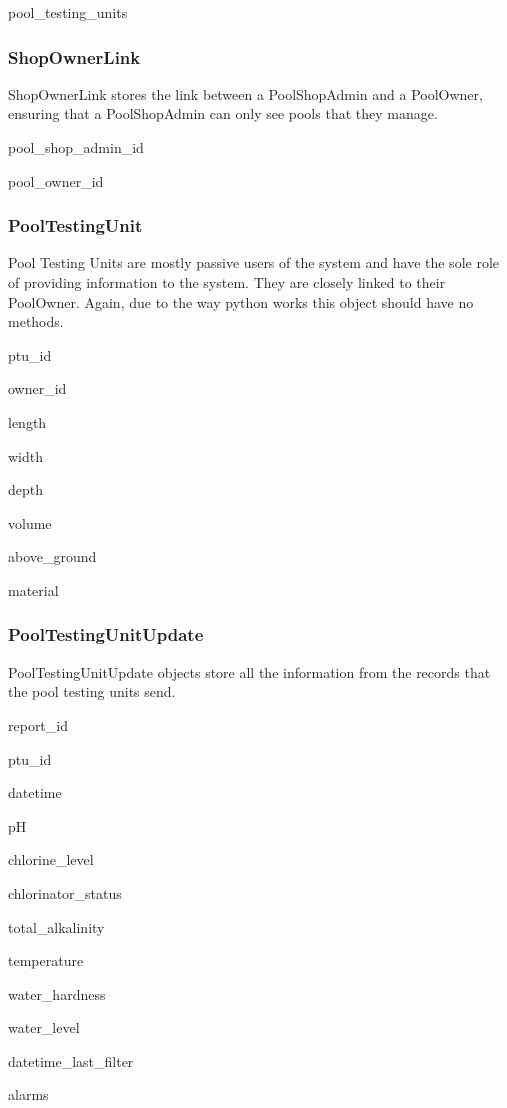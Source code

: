 {
	\item pool\_testing\_units
}
{
	\item
}

\subsubsection{ShopOwnerLink}
\par
ShopOwnerLink stores the link between a PoolShopAdmin and a PoolOwner, ensuring that  a PoolShopAdmin can only see pools that they manage.

{
	\item pool\_shop\_admin\_id
	\item pool\_owner\_id
}
{
	\item
}

\subsubsection{PoolTestingUnit}
\par
Pool Testing Units are mostly passive users of the system and have the sole role of providing information to the system. They are closely linked to their PoolOwner. Again, due to the way python works this object should have no methods.

{
	\item ptu\_id
	\item owner\_id
	\item length
	\item width
	\item depth
	\item volume
	\item above\_ground
	\item material
						
}
{
	\item
}

\subsubsection{PoolTestingUnitUpdate}
\par
PoolTestingUnitUpdate objects store all the information from the records that the pool testing units send.

{
	\item report\_id
	\item ptu\_id
	\item datetime
	\item pH
	\item chlorine\_level
	\item chlorinator\_status
	\item total\_alkalinity
	\item temperature
	\item water\_hardness
	\item water\_level
	\item datetime\_last\_filter
	\item alarms
}
{
	\item
}

